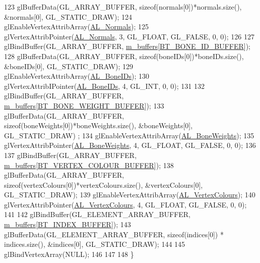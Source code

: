 \begin{DoxyCode}
123   glBufferData(GL\_ARRAY\_BUFFER, \textcolor{keyword}{sizeof}(normals[0])*normals.size(), &normals[0], GL\_STATIC\_DRAW);
124   glEnableVertexAttribArray(\hyperlink{_shader_8h_abeea86fa7b6213f5a961556c17de93c8a58a4bca39ba0f29a5c4e3c7443c48b7b}{AL\_Normals});
125   glVertexAttribPointer(\hyperlink{_shader_8h_abeea86fa7b6213f5a961556c17de93c8a58a4bca39ba0f29a5c4e3c7443c48b7b}{AL\_Normals}, 3, GL\_FLOAT, GL\_FALSE, 0, 0);
126 
127   glBindBuffer(GL\_ARRAY\_BUFFER, \hyperlink{class_renderable_object_abee52bb51bcb4392073cbb890d39a216}{m\_buffers}[\hyperlink{_renderable_object_8h_a3e5d410ec73ff739b77335fae2a20d37a2c4865bda968a794c38a07e20a514463}{BT\_BONE\_ID\_BUFFER}]);
128   glBufferData(GL\_ARRAY\_BUFFER, \textcolor{keyword}{sizeof}(boneIDs[0])*boneIDs.size(), &boneIDs[0], GL\_STATIC\_DRAW);
129   glEnableVertexAttribArray(\hyperlink{_shader_8h_abeea86fa7b6213f5a961556c17de93c8a7381dbc4983ad8ae74f73c33e0ea0398}{AL\_BoneIDs});
130   glVertexAttribIPointer(\hyperlink{_shader_8h_abeea86fa7b6213f5a961556c17de93c8a7381dbc4983ad8ae74f73c33e0ea0398}{AL\_BoneIDs}, 4, GL\_INT, 0, 0);
131 
132   glBindBuffer(GL\_ARRAY\_BUFFER, \hyperlink{class_renderable_object_abee52bb51bcb4392073cbb890d39a216}{m\_buffers}[\hyperlink{_renderable_object_8h_a3e5d410ec73ff739b77335fae2a20d37a2c7d03d59a7ffd4ed2d6a68db931bd25}{BT\_BONE\_WEIGHT\_BUFFER}]);
133   glBufferData(GL\_ARRAY\_BUFFER, \textcolor{keyword}{sizeof}(boneWeights[0])*boneWeights.size(), &boneWeights[0], GL\_STATIC\_DRAW)
      ;
134   glEnableVertexAttribArray(\hyperlink{_shader_8h_abeea86fa7b6213f5a961556c17de93c8aad87afe06b4cb09ff2ef7baf857ad1dd}{AL\_BoneWeights});
135   glVertexAttribPointer(\hyperlink{_shader_8h_abeea86fa7b6213f5a961556c17de93c8aad87afe06b4cb09ff2ef7baf857ad1dd}{AL\_BoneWeights}, 4, GL\_FLOAT, GL\_FALSE, 0, 0);
136 
137   glBindBuffer(GL\_ARRAY\_BUFFER, \hyperlink{class_renderable_object_abee52bb51bcb4392073cbb890d39a216}{m\_buffers}[\hyperlink{_renderable_object_8h_a3e5d410ec73ff739b77335fae2a20d37a9ed9ffee92c9b9074916642a8127f451}{BT\_VERTEX\_COLOUR\_BUFFER}]);
138   glBufferData(GL\_ARRAY\_BUFFER, \textcolor{keyword}{sizeof}(vertexColours[0])*vertexColours.size(), &vertexColours[0], 
      GL\_STATIC\_DRAW);
139   glEnableVertexAttribArray(\hyperlink{_shader_8h_abeea86fa7b6213f5a961556c17de93c8aa2e92385454161732322e2951be00d42}{AL\_VertexColours});
140   glVertexAttribPointer(\hyperlink{_shader_8h_abeea86fa7b6213f5a961556c17de93c8aa2e92385454161732322e2951be00d42}{AL\_VertexColours}, 4, GL\_FLOAT, GL\_FALSE, 0, 0);
141 
142   glBindBuffer(GL\_ELEMENT\_ARRAY\_BUFFER, \hyperlink{class_renderable_object_abee52bb51bcb4392073cbb890d39a216}{m\_buffers}[\hyperlink{_renderable_object_8h_a3e5d410ec73ff739b77335fae2a20d37a4d3c91cb7fffc7e4b7301d7367d7c3f8}{BT\_INDEX\_BUFFER}]);
143   glBufferData(GL\_ELEMENT\_ARRAY\_BUFFER, \textcolor{keyword}{sizeof}(indices[0]) * indices.size(), &indices[0], GL\_STATIC\_DRAW);
144 
145   glBindVertexArray(NULL);
146 
147 
148 \}
\end{DoxyCode}


